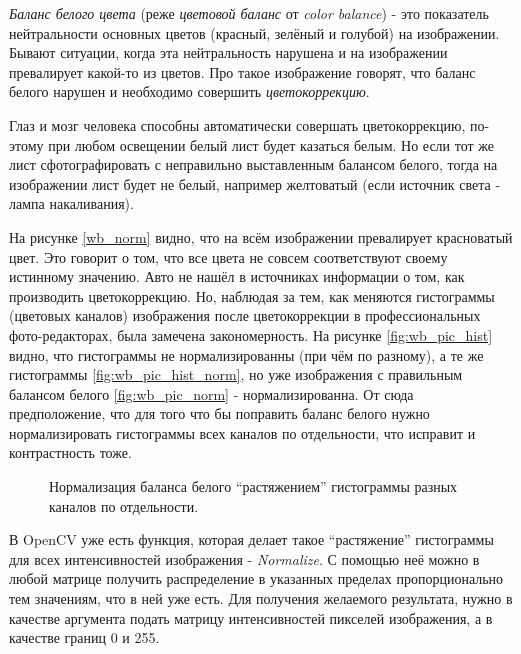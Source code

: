 \documentclass[12pt]{report}
\begin{document}
\emph{Баланс белого цвета} (реже \emph{цветовой баланс} от \textit{color balance}) - это показатель нейтральности 
основных цветов (красный, зелёный и голубой) на изображении. Бывают ситуации, когда эта нейтральность нарушена и на 
изображении превалирует какой-то из цветов. Про такое изображение говорят, что баланс белого нарушен и необходимо 
совершить \emph{цветокоррекцию}. 

Глаз и мозг человека способны автоматически совершать цветокоррекцию, по-этому при любом освещении белый лист будет 
казаться белым. Но если тот же лист сфотографировать с неправильно выставленным балансом белого, тогда на изображении 
лист будет не белый, например желтоватый (если источник света - лампа накаливания).

На рисунке \ref{wb_norm} видно, что на всём изображении превалирует красноватый цвет. Это говорит о том, что все 
цвета не совсем соответствуют своему истинному значению. Авто не нашёл  в источниках информации о том, как 
производить цветокоррекцию. Но, наблюдая за тем, как меняются гистограммы (цветовых каналов) изображения после 
цветокоррекции в профессиональных фото-редакторах, была замечена закономерность. На рисунке \ref{fig:wb_pic_hist} 
видно, что гистограммы не нормализированны (при чём по разному), а те же гистограммы \ref{fig:wb_pic_hist_norm}, но 
уже изображения с правильным балансом белого \ref{fig:wb_pic_norm} - нормализированна. От сюда предположение, что для 
того что бы поправить баланс белого нужно нормализировать гистограммы всех каналов по отдельности, что исправит и 
контрастность тоже.

\begin{figure}[h]
	\centering
		
	\caption{Нормализация баланса белого ``растяжением'' гистограммы разных каналов по отдельности.}
	\label{fig:wb_norm}
\end{figure}

В OpenCV уже есть функция, которая делает такое ``растяжение'' гистограммы для всех интенсивностей изображения - 
\textit{Normalize}. С помощью неё можно в любой матрице получить распределение в указанных пределах пропорционально 
тем значениям, что в ней уже есть. Для получения желаемого результата, нужно в качестве аргумента подать матрицу 
интенсивностей пикселей изображения, а в качестве границ 0 и 255.
\end{document}
